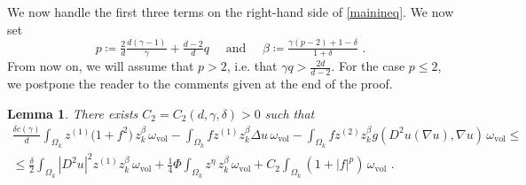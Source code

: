 \documentclass[10pt, a4paper, reqno, oneside]{amsart}
\theoremstyle{plain}
\theoremstyle{definition}
\theoremstyle{plain}
\newtheorem{lemma}[theo]{Lemma}
\theoremstyle{definition}
\theoremstyle{plain}
\renewcommand{\=}{:=}
\begin{document}
We now handle the first three terms on the right-hand side of \eqref{mainineq}. We now set
\begin{equation}\label{p}
p \coloneqq \tfrac{2}{d}\tfrac{d(\gamma-1)}{\gamma} +\tfrac{d-2}{d}q \quad \text{ and } \quad \beta \coloneqq \tfrac{\gamma(p-2)+1-\delta}{1+\delta} \,\, .
\end{equation}
From now on, we will assume that $p>2$, i.e. that $\gamma q > \frac{2d}{d-2}$. For the case $p\leq 2$, we postpone the reader to the comments given at the end of the proof.

\begin{lemma}
There exists $C_2 = C_2(d,\gamma,\delta)>0$ such that
\begin{multline} \label{mainineq2}
\tfrac{\delta c(\gamma)}{d} \int_{\Omega_k} z^{(1)}\big(1+f^2\big) \, z_k^{\beta}\, \omega_{\mathrm{vol}}
-\int_{\Omega_k} fz^{(1)}z_k^{\beta}\Delta u\, \omega_{\mathrm{vol}}
-\int_{\Omega_k} fz^{(2)}z_k^{\beta}g(D^2u(\nabla u),\nabla u)\, \omega_{\mathrm{vol}} \leq \\
\leq
\tfrac{\delta}2 \int_{\Omega_k}|D^2u|^2 z^{(1)} z_k^{\beta}\, \omega_{\mathrm{vol}}
+\tfrac14\Phi \int_{\Omega_k} z^{\eta}\,z_k^{\beta} \, \omega_{\mathrm{vol}}
+C_2 \int_{\Omega_k} (1+|f|^p) \, \omega_{\mathrm{vol}} \,\, .
\end{multline}
\end{lemma}
\end{document}
